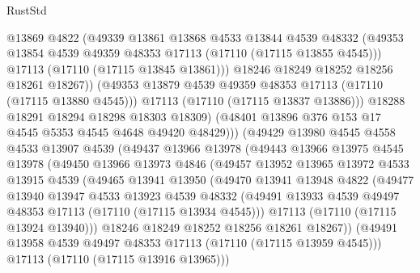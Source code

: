 \begin{lexlean}{RustStd}
\begin{coremodule}
                      @13869
                      @4822
                      (@49339
                        @13861
                        @13868
                        @4533
                        @13844
                        @4539
                        @48332
                        (@49353 @13854 @4539 @49359 @48353 @17113 (@17110 (@17115 @13855 @4545)))
                        @17113
                        (@17110 (@17115 @13845 @13861)))
                      @18246
                      @18249
                      @18252
                      @18256
                      @18261
                      @18267))
                  (@49353 @13879 @4539 @49359 @48353 @17113 (@17110 (@17115 @13880 @4545)))
                  @17113
                  (@17110 (@17115 @13837 @13886)))
                @18288
                @18291
                @18294
                @18298
                @18303
                @18309)
              (@48401 @13896 @376 @153 @17 @4545 @5353 @4545 @4648 @49420 @48429)))
          (@49429
            @13980
            @4545
            @4558
            @4533
            @13907
            @4539
            (@49437
              @13966
              @13978
              (@49443
                @13966
                @13975
                @4545
                @13978
                (@49450
                  @13966
                  @13973
                  @4846
                  (@49457
                    @13952
                    @13965
                    @13972
                    @4533
                    @13915
                    @4539
                    (@49465
                      @13941
                      @13950
                      (@49470
                        @13941
                        @13948
                        @4822
                        (@49477
                          @13940
                          @13947
                          @4533
                          @13923
                          @4539
                          @48332
                          (@49491 @13933 @4539 @49497 @48353 @17113 (@17110 (@17115 @13934 @4545)))
                          @17113
                          (@17110 (@17115 @13924 @13940)))
                        @18246
                        @18249
                        @18252
                        @18256
                        @18261
                        @18267))
                    (@49491 @13958 @4539 @49497 @48353 @17113 (@17110 (@17115 @13959 @4545)))
                    @17113
                    (@17110 (@17115 @13916 @13965)))

\end{coremodule}
\end{lexlean}
